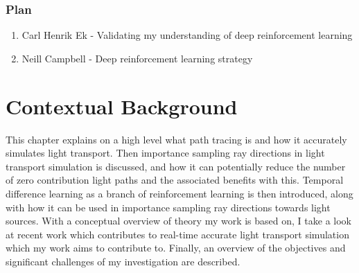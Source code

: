 \documentclass[ %
                    author={Callum Pearce},
                supervisor={Dr. Neill Campbell},
                    degree={MEng},
                     title={How effective are Temporal difference learning methods for reducing the number of zero contribution light paths, while still accurately approximating Global Illumination in Path tracing?},
                  subtitle={},
                      type={research},
                      year={2019} ]{dissertation}
\begin{document}
\subsection{Plan}
\begin{enumerate}
\item Carl Henrik Ek - Validating my understanding of deep reinforcement learning
\item Neill Campbell - Deep reinforcement learning strategy
\end{enumerate}


%

\mainmatter


\chapter{Contextual Background}
\label{chap:context}


This chapter explains on a high level what path tracing is and how it accurately 
simulates light transport. Then importance sampling ray directions in light
transport simulation is discussed, and how it can potentially reduce the number 
of zero contribution light paths and the associated benefits with this. Temporal 
difference learning as a branch of reinforcement learning is then introduced, 
along with how it can be used in importance sampling ray directions towards 
light sources. With a conceptual overview of theory my work is based on, I take 
a look at recent work which contributes to real-time accurate light transport 
simulation which my work aims to contribute to. Finally, an overview of the 
objectives and significant challenges of my investigation are described.
\end{document}

